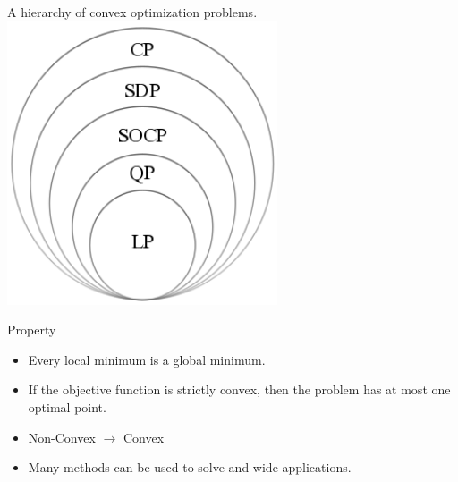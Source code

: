     \begin{frame}{A hierarchy of convex optimization problems.}
      \centering
      \includegraphics[width = 0.6\textwidth]{images/convex.png}
    \end{frame}

    \begin{frame}{Property}
      \begin{spacing}{1.5}
        \begin{itemize}
          \item Every local minimum is a global minimum.
          \item If the objective function is strictly convex, then the problem has at most one optimal point.
          \item Non-Convex $\to$ Convex
          \item Many methods can be used to solve and wide applications.
        \end{itemize}
      \end{spacing}
    \end{frame}

